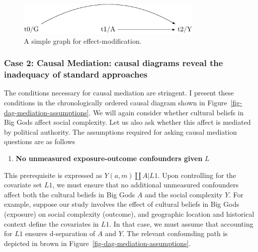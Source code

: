 \documentclass[
  singlecolumn]{article}
\providecommand{\tightlist}{%
  \setlength{\itemsep}{0pt}\setlength{\parskip}{0pt}}\usepackage{longtable,booktabs,array}
\begin{document}
\begin{figure}

{\centering \includegraphics[width=0.8\textwidth,height=\textheight]{causal-dags_files/figure-pdf/fig-dag-effect-modfication-1.pdf}

}

\caption{\label{fig-dag-effect-modfication}A simple graph for
effect-modification.}

\end{figure}

\hypertarget{case-2-causal-mediation-causal-diagrams-reveal-the-inadequacy-of-standard-approaches}{%
\subsubsection{Case 2: Causal Mediation: causal diagrams reveal the
inadequacy of standard
approaches}\label{case-2-causal-mediation-causal-diagrams-reveal-the-inadequacy-of-standard-approaches}}

The conditions necessary for causal mediation are stringent. I present
these conditions in the chronologically ordered causal diagram shown in
Figure~\ref{fig-dag-mediation-assumptions}. We will again consider
whether cultural beliefs in Big Gods affect social complexity. Let us
also ask whether this affect is mediated by political authority. The
assumptions required for asking causal mediation questions are as
follows

\begin{enumerate}
\def\labelenumi{\arabic{enumi}.}
\tightlist
\item
  \textbf{No unmeasured exposure-outcome confounders given} \(L\)
\end{enumerate}

This prerequisite is expressed as \(Y(a,m) \coprod A | L1\). Upon
controlling for the covariate set \(L1\), we must ensure that no
additional unmeasured confounders affect both the cultural beliefs in
Big Gods \(A\) and the social complexity \(Y\). For example, suppose our
study involves the effect of cultural beliefs in Big Gods (exposure) on
social complexity (outcome), and geographic location and historical
context define the covariates in \(L1\). In that case, we must assume
that accounting for \(L1\) ensures d-separation of \(A\) and \(Y\). The
relevant confounding path is depicted in brown in
Figure~\ref{fig-dag-mediation-assumptions}.
\end{document}
